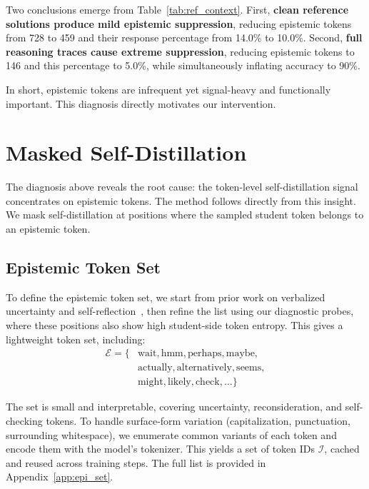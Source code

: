 \documentclass[11pt]{article}
\begin{document}
Two conclusions emerge from Table~\ref{tab:ref_context}.
First, \textbf{clean reference solutions produce mild epistemic suppression}, reducing epistemic tokens from 728 to 459 and their response percentage from 14.0\% to 10.0\%.
Second, \textbf{full reasoning traces cause extreme suppression}, reducing epistemic tokens to 146 and this percentage to 5.0\%, while simultaneously inflating accuracy to 90\%.

In short, epistemic tokens are infrequent yet signal-heavy and functionally important. This diagnosis directly motivates our intervention.

\section{Masked Self-Distillation}

The diagnosis above reveals the root cause: the token-level self-distillation signal concentrates on epistemic tokens.
The method follows directly from this insight.
We mask self-distillation at positions where the sampled student token belongs to an epistemic token.

\subsection{Epistemic Token Set}
\label{sec:epistemic_token_set}

To define the epistemic token set, we start from prior work on verbalized uncertainty and self-reflection~\cite{yona2024faithfully,wang2025wait,troitskii2025internal}, then refine the list using our diagnostic probes, where these positions also show high student-side token entropy.
This gives a lightweight token set, including:
\begin{equation}
\begin{aligned}
    \mathcal{E} = \{&\text{wait}, \text{hmm}, \text{perhaps}, \text{maybe}, \\
                    &\text{actually}, \text{alternatively}, \text{seems}, \\
                    &\text{might}, \text{likely}, \text{check}, \ldots\}
\end{aligned}
\end{equation}

The set is small and interpretable, covering uncertainty, reconsideration, and self-checking tokens.
To handle surface-form variation (capitalization, punctuation, surrounding whitespace), we enumerate common variants of each token and encode them with the model's tokenizer.
This yields a set of token IDs $\mathcal{I}$, cached and reused across training steps. The full list is provided in Appendix~\ref{app:epi_set}.
\end{document}
